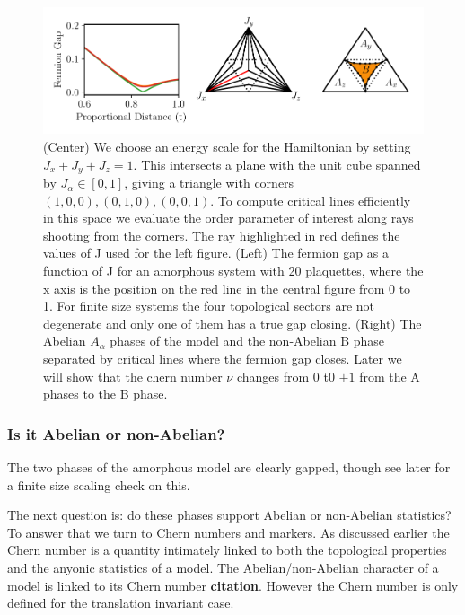 \begin{figure}
\hypertarget{fig:phase_diagram}{%
\centering
\includegraphics[width=1\textwidth,height=\textheight]{figure_code/amk_chapter/results/phase_diagram/phase_diagram.pdf}
\caption{(Center) We choose an energy scale for the Hamiltonian by setting \(J_x + J_y + J_z = 1\). This intersects a plane with the unit cube spanned by \(J_\alpha \in [0,1]\), giving a triangle with corners \((1,0,0), (0,1,0), (0,0,1)\). To compute critical lines efficiently in this space we evaluate the order parameter of interest along rays shooting from the corners. The ray highlighted in red defines the values of J used for the left figure. (Left) The fermion gap as a function of J for an amorphous system with 20 plaquettes, where the x axis is the position on the red line in the central figure from 0 to 1. For finite size systems the four topological sectors are not degenerate and only one of them has a true gap closing. (Right) The Abelian \(A_\alpha\) phases of the model and the non-Abelian B phase separated by critical lines where the fermion gap closes. Later we will show that the chern number \(\nu\) changes from \(0\) t0 \(\pm 1\) from the A phases to the B phase.}\label{fig:phase_diagram}
}
\end{figure}

\hypertarget{is-it-abelian-or-non-abelian}{%
\subsubsection{Is it Abelian or non-Abelian?}\label{is-it-abelian-or-non-abelian}}

The two phases of the amorphous model are clearly gapped, though see later for a finite size scaling check on this.

The next question is: do these phases support Abelian or non-Abelian statistics? To answer that we turn to Chern numbers and markers. As discussed earlier the Chern number is a quantity intimately linked to both the topological properties and the anyonic statistics of a model. The Abelian/non-Abelian character of a model is linked to its Chern number \textbf{citation}. However the Chern number is only defined for the translation invariant case.

